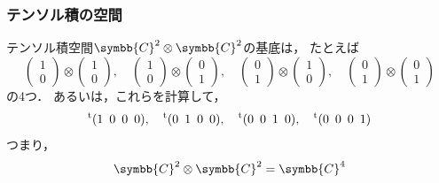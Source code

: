 \documentclass[
    10pt,
    ]{sotsu-beamer}
\begin{document}
\begin{frame}
    \frametitle{テンソル積の空間}

    テンソル積空間$\symbb{C}^2 \otimes \symbb{C}^2$の基底は，
    たとえば
    \begin{equation*}
        \begin{pmatrix}
            1  \\  0
        \end{pmatrix}
        \otimes 
        \begin{pmatrix}
            1  \\  0
        \end{pmatrix}
        , 
        \quad 
        \begin{pmatrix}
            1  \\  0
        \end{pmatrix}
        \otimes 
        \begin{pmatrix}
            0  \\  1
        \end{pmatrix}
        , 
        \quad 
        \begin{pmatrix}
            0  \\  1
        \end{pmatrix}
        \otimes 
        \begin{pmatrix}
            1  \\  0
        \end{pmatrix}
        , 
        \quad 
        \begin{pmatrix}
            0  \\  1
        \end{pmatrix}
        \otimes 
        \begin{pmatrix}
            0  \\  1
        \end{pmatrix}        
    \end{equation*}
    の4つ．
    あるいは，これらを計算して，
    \begin{equation*}
        \cvector{1 ; 0 ; 0 ; 0},
        \quad 
        \cvector{0 ; 1 ; 0 ; 0},
        \quad 
        \cvector{0 ; 0 ; 1 ; 0},
        \quad 
        \cvector{0 ; 0 ; 0 ; 1}
    \end{equation*}
    つまり，
    \begin{equation*}
        \symbb{C}^2 \otimes \symbb{C}^2 = \symbb{C}^4
    \end{equation*}

\end{frame}
\end{document}
